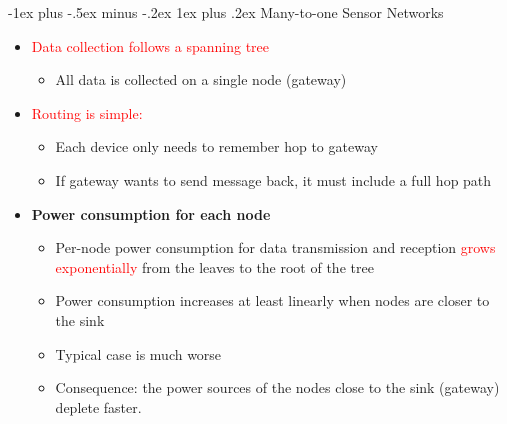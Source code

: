 \documentclass[10pt,landscape]{article}
\makeatletter
\newcommand{\subsubsubsection}{\@startsection{subsubsection}{3}{0mm}%
                                {-1ex plus -.5ex minus -.2ex}%
                                {1ex plus .2ex}%
                                {\normalfont\scriptsize\bfseries}}
\newcommand{\1}{\mathmybb{1}}
\makeatother
\begin{document}
\begin{multicols*}{3}
\subsubsubsection{Many-to-one Sensor Networks}
\begin{itemize}
  \item \textcolor{red}{Data collection follows a spanning tree}
  \begin{itemize}
    \item All data is collected on a single node (gateway)
  \end{itemize}
  \item \textcolor{red}{Routing is simple:}
  \begin{itemize}
    \item Each device only needs to remember hop to gateway
    \item If gateway wants to send message back, it must include a full hop path
  \end{itemize}
  \item \textbf{Power consumption for each node}
  \begin{itemize}
    \item Per-node power consumption for data transmission and reception \textcolor{red}{grows exponentially} from the leaves to the root of the tree
    \item Power consumption increases at least linearly when nodes are closer to the sink
    \item Typical case is much worse
    \item Consequence: the power sources of the nodes close to the sink (gateway) deplete faster.
  \end{itemize}
\end{itemize}

\begin{center}
\end{center}



\end{multicols*}
\end{document}
